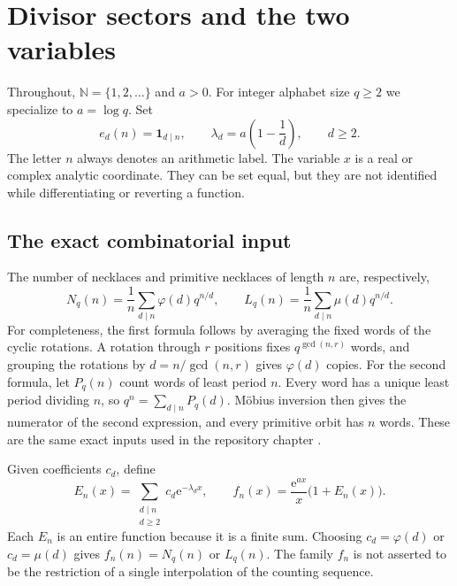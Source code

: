 \documentclass[11pt,a4paper]{article}
\numberwithin{equation}{section}
\theoremstyle{definition}
\theoremstyle{remark}
\newcommand{\N}{\mathbb N}
\newcommand{\ee}{\mathrm e}
\newcommand{\ind}{\mathbf 1}
\begin{document}
\section{Divisor sectors and the two variables}\label{sec:data}

Throughout, $\N=\{1,2,\ldots\}$ and $a>0$. For integer alphabet size
$q\ge2$ we specialize to $a=\log q$. Set
\begin{equation}
 e_d(n)=\ind_{d\mid n},\qquad
 \lambda_d=a\left(1-\frac1d\right),\qquad d\ge2.
 \label{eq:actions}
\end{equation}
The letter $n$ always denotes an arithmetic label. The variable $x$ is a
real or complex analytic coordinate. They can be set equal, but they are
not identified while differentiating or reverting a function.

\subsection{The exact combinatorial input}

The number of necklaces and primitive necklaces of length $n$ are,
respectively,
\begin{equation}
 N_q(n)=\frac1n\sum_{d\mid n}\varphi(d)q^{n/d},\qquad
 L_q(n)=\frac1n\sum_{d\mid n}\mu(d)q^{n/d}.
 \label{eq:counts}
\end{equation}
For completeness, the first formula follows by averaging the fixed words
of the cyclic rotations. A rotation through $r$ positions fixes
$q^{\gcd(n,r)}$ words, and grouping the rotations by
$d=n/\gcd(n,r)$ gives $\varphi(d)$ copies. For the second formula, let
$P_q(n)$ count words of least period $n$. Every word has a unique least
period dividing $n$, so $q^n=\sum_{d\mid n}P_q(d)$. M\"obius inversion
then gives the numerator of the second expression, and every primitive
orbit has $n$ words. These are the same exact inputs used in the
repository chapter \cite{repo}.

Given coefficients $c_d$, define
\begin{equation}
 E_n(x)=\sum_{\substack{d\mid n\\d\ge2}}c_d\ee^{-\lambda_d x},
 \qquad f_n(x)=\frac{\ee^{ax}}x\bigl(1+E_n(x)\bigr).
 \label{eq:sheets}
\end{equation}
Each $E_n$ is an entire function because it is a finite sum. Choosing
$c_d=\varphi(d)$ or $c_d=\mu(d)$ gives $f_n(n)=N_q(n)$ or $L_q(n)$.
The family $f_n$ is not asserted to be the restriction of a single
interpolation of the counting sequence.
\end{document}
